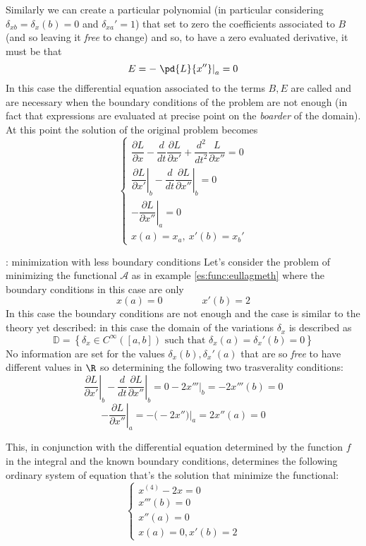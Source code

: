	Similarly we can create a particular polynomial (in particular considering $ \delta_{xb} = \delta_x(b) = 0$ and $\delta_{xa}' = 1$) that set to zero the coefficients associated to $B$ (and so leaving it \textit{free} to change) and so, to have a zero evaluated derivative, it must be that
	\[ E = - \left. \pd{L }{x''} \right|_a = 0 \] 
	In this case the differential equation associated to the terms $B,E$ are called  and are necessary when the boundary conditions of the problem are not enough (in fact that expressions are evaluated at precise point on the \textit{boarder} of the domain). At this point the solution of the original problem becomes
	\[ \begin{cases}
		\dfrac{\partial L }{\partial x} - \dfrac{d}{dt} \dfrac{\partial L }{\partial x'} + \dfrac{d^2}{dt^2} \dfrac{L }{\partial x''} = 0 \\
		\left.\dfrac{\partial L }{\partial x'} \right|_b - \left. \dfrac{d}{dt} \dfrac{\partial L }{\partial x''} \right|_b = 0\\
		-\left. \dfrac{\partial L }{\partial x''} \right|_a = 0 \\
		x(a) = x_a, \ x'(b) = x_b'
	\end{cases} \]
	
	\begin{example}{: minimization with less boundary conditions}
		Let's consider the problem of minimizing the functional $\mathcal A$ as in example \ref{es:func:eullagmeth} where the boundary conditions in this case are only
		\[ x(a) = 0 \qquad \qquad x'(b) = 2  \]
		In this case the boundary conditions are not enough and the case is similar to the theory yet described: in this case the domain of the variations $\delta_x$ is described as
		\[ \mathds D = \left\{ \delta_x\in C^\infty([a,b]) \textrm{ such that } \delta_x(a) =\delta_x'(b) = 0 \right\} \]
		No information are set for the values $\delta_x(b), \delta_x'(a)$ that are so \textit{free} to have different values in $\R$ so determining the following two trasverality conditions:
		\[ \left.\dfrac{\partial L }{\partial x'} \right|_b - \left. \dfrac{d}{dt} \dfrac{\partial L }{\partial x''} \right|_b = 0-2x'''\Big|_b = -2x'''(b) = 0 \]\[ -\left. \dfrac{\partial L }{\partial x''} \right|_a = - \big(-2x''\big)\Big|_a = 2x''(a) = 0   \]
		
		This, in conjunction with the differential equation determined by the function $f$ in the integral and the known boundary conditions, determines the following ordinary system of equation that's the solution that minimize the functional:
		\[ \begin{cases}
			x^{(4)} - 2x = 0 \\
			x'''(b) = 0 \\ x''(a) = 0 \\
			x(a) = 0, x'(b) = 2
		\end{cases} \]		
	\end{example}
	
